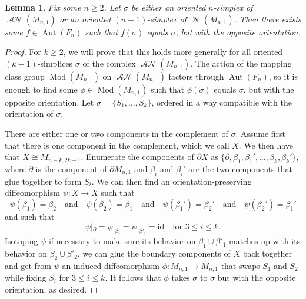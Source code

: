 \documentclass[11pt]{amsart}
\numberwithin{equation}{section}
\theoremstyle{plain}
\newtheorem{lemma}[theorem]{Lemma}
\theoremstyle{definition}
\theoremstyle{remark}
\DeclareMathOperator{\Aut}{Aut}
\DeclareMathOperator{\Mod}{Mod}
\DeclareMathOperator{\NSpheres}{\mathcal{N}}
\DeclareMathOperator{\ANSpheres}{\mathcal{AN}}
\begin{document}
\begin{lemma} 
\label{lemma:fliplemma}
Fix some $n \geq 2$.  Let $\sigma$ be either an oriented $n$-simplex of $\ANSpheres(M_{n,1})$ or an oriented $(n-1)$-simplex
of $\NSpheres(M_{n,1})$.  Then there exists some $f \in \Aut(F_n)$ such that $f(\sigma)$ equals $\sigma$, but with
the opposite orientation.
\end{lemma}
\begin{proof}
For $k \geq 2$, we will prove that this holds more generally for all oriented $(k-1)$-simplices $\sigma$ of the complex $\ANSpheres(M_{n,1})$.
The action of the mapping class group $\Mod(M_{n,1})$ on $\ANSpheres(M_{n,1})$ factors through $\Aut(F_n)$, so it is enough
to find some $\phi \in \Mod(M_{n,1})$ such that $\phi(\sigma)$ equals $\sigma$, but with the opposite orientation.
Let $\sigma = \{S_1,\ldots,S_k\}$, ordered in a way compatible with the orientation of $\sigma$.

There are either one or two components in the complement of $\sigma$.  Assume first that there is one component in the complement, which
we call $X$.  We then have that $X \cong M_{n-k,2k+1}$.  Enumerate the components of $\partial X$ as 
$\{\partial, \beta_1, \beta_1', \ldots, \beta_k, \beta_k'\}$, where $\partial$ is the component of $\partial M_{n,1}$ and
$\beta_i$ and $\beta_i'$ are the two components that glue together to form $S_i$.  We can then find an orientation-preserving
diffeomorphism $\psi\colon X \rightarrow X$ such that
\[\psi(\beta_1) = \beta_2 \quad \text{and} \quad \psi(\beta_2) = \beta_1 \quad \text{and} \quad 
\psi(\beta_1') = \beta_2' \quad \text{and} \quad \psi(\beta_2') = \beta_1'\]
and such that
\[\psi|_{\partial} = \psi|_{\beta_i} = \psi|_{\beta'_i} = \text{id} \quad \text{for $3 \leq i \leq k$}.\]
Isotoping $\psi$ if necessary to make sure its behavior on $\beta_1 \cup \beta'_1$ matches up with its
behavior on $\beta_2 \cup \beta'_2$, we can glue the boundary components of $X$ back together and get
from $\psi$ an induced diffeomorphism $\phi\colon M_{n,1} \rightarrow M_{n,1}$ that swaps $S_1$ and $S_2$
while fixing $S_i$ for $3 \leq i \leq k$.  It follows that $\phi$ takes $\sigma$ to $\sigma$ but with the opposite
orientation, as desired.


\end{proof}
\end{document}
